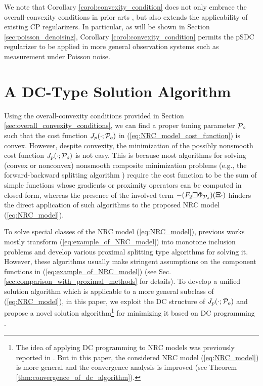 \documentclass[lettersize,journal]{IEEEtran}
\theoremstyle{plain}%
\theoremstyle{definition}
\theoremstyle{remark}
\begin{document}
We note that Corollary \ref{corol:convexity_condition} does not only embrace the overall-convexity conditions in prior arts \cite{selesnick2017,abe2020,alshabili2021}, but also extends the applicability of existing CP regularizers. In particular, as will be shown in Section \ref{sec:poisson_denoising}, Corollary \ref{corol:convexity_condition} permits the pSDC regularizer to be applied in more general observation systems such as measurement under Poisson noise.


\section{A DC-Type Solution Algorithm}
\label{sec:dc_algorithm}
Using the overall-convexity conditions provided in Section \ref{sec:overall_convexity_conditions}, we can find a proper tuning parameter $\mathcal{P}_o$ such that the cost function $J_{p}(\cdot;\mathcal{P}_o)$ in (\ref{eq:NRC_model_cost_function}) is convex. However, despite convexity, the minimization of the possibly nonsmooth cost function $J_{p}(\cdot;\mathcal{P}_o)$ is not easy. This is because most algorithms for solving (convex or nonconvex) nonsmooth composite minimization problems (e.g., the forward-backward splitting algorithm \cite{attouch2013}) require the cost function to be the sum of simple functions whose gradients or proximity operators can be computed in closed-form, whereas the presence of the involved term $-(F_2\Box\Phi_{\mathcal{P}_o})(\bm{\Xi} \cdot)$ hinders the direct application of such algorithms to the proposed NRC model (\ref{eq:NRC_model}).

To solve special classes of the NRC model (\ref{eq:NRC_model}), previous works \cite{selesnick2017,abe2020,alshabili2021,yata2021} mostly transform (\ref{eq:example_of_NRC_model}) into monotone inclusion problems \cite{bauschke2017} and develop various proximal splitting \cite{combettes2011} type algorithms for solving it. However, these algorithms  usually make stringent assumptions on the component functions in (\ref{eq:example_of_NRC_model}) (see Sec. \ref{sec:comparison_with_proximal_methods} for details). To develop a unified solution algorithm which is applicable to a more general subclass of (\ref{eq:NRC_model}), in this paper, we exploit the DC structure of $J_{p}(\cdot;\mathcal{P}_o)$ and propose a novel solution algorithm\footnote{The idea of applying DC programming to NRC models was previously reported in \cite{zhang2021,zhang2022}. But in this paper, the considered NRC model (\ref{eq:NRC_model}) is more general and the convergence analysis is improved (see Theorem \ref{thm:convergence_of_dc_algorithm}).} for minimizing it based on DC programming \cite{le2018}.
\end{document}
